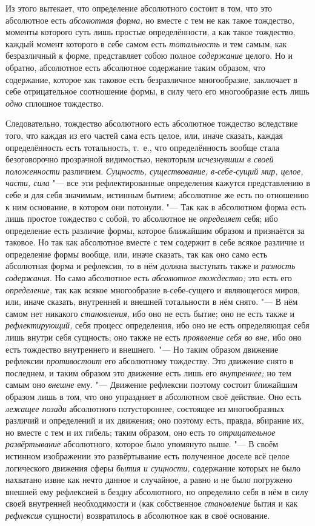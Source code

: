 Из этого вытекает, что определение абсолютного состоит в том, что это
абсолютное есть {\em абсолютная форма,} но вместе с тем
не как такое тождество, моменты которого суть лишь простые определённости,
а как такое тождество, каждый момент которого в себе самом есть
{\em тотальность} и тем самым, как безразличный к
форме, представляет собою полное {\em содержание}
целого. Но и обратно, абсолютное есть абсолютное содержание таким образом,
что содержание, которое как таковое есть безразличное многообразие,
заключает в себе отрицательное соотношение формы, в силу чего его
многообразие есть лишь {\em одно} сплошное тождество.

Следовательно, тождество абсолютного есть абсолютное тождество вследствие
того, что каждая из его частей сама есть целое, или, иначе сказать, каждая
определённость есть тотальность, т.~е., что определённость вообще стала
безоговорочно прозрачной видимостью, некоторым
{\em исчезнувшим в своей положенности} различием.
{\em Сущность, существование, в-себе-сущий мир, целое,
части, сила} "--- все эти рефлектированные определения кажутся представлению в
себе и для себя значимым, истинным бытием; абсолютное же есть по отношению
к ним основание, в котором они потонули. "--- Так как в абсолютном форма есть
лишь простое тождество с собой, то абсолютное не
{\em определяет} себя; ибо определение есть различие
формы, которое ближайшим образом и признаётся за таковое. Но так как
абсолютное вместе с тем содержит в себе всякое различие и определение формы
вообще, или, иначе сказать, так как оно само есть абсолютная форма и
рефлексия, то в нём должна выступать также и
{\em разность содержания}. Но само абсолютное есть
{\em абсолютное тождество;} это есть его
{\em определение,} так как всякое многообразие
в-себе-сущего и являющегося миров, или, иначе сказать, внутренней и внешней
тотальности в нём снято. "--- В нём самом нет никакого
{\em становления,} ибо оно не есть бытие; оно не есть
также и {\em рефлектирующий,} себя процесс определения,
ибо оно не есть определяющая себя лишь внутри себя сущность; оно также не
есть {\em проявление себя во вне,} ибо оно есть
тождество внутреннего и внешнего. "--- Но таким образом движение рефлексии
{\em противостоит} его абсолютному тождеству. Это
движение снято в последнем, и таким образом это движение есть лишь его
{\em внутреннее;} но тем самым оно
{\em внешне} ему. "--- Движение рефлексии поэтому состоит
ближайшим образом лишь в том, что оно упраздняет в абсолютном своё
действие. Оно есть {\em лежащее позади} абсолютного
потустороннее, состоящее из многообразных различий и определений и их
движения; оно поэтому есть, правда, вбирание их, но вместе с тем и их
гибель; таким образом, оно есть то {\em отрицательное
развёртывание} абсолютного, которое было упомянуто выше. "--- В своём истинном
изображении это развёртывание есть полученное доселе всё целое логического
движения сферы {\em бытия и сущности,} содержание
которых не было нахватано извне как нечто данное и случайное, а равно и не
было погружено внешней ему рефлексией в бездну абсолютного, но определило
себя в нём в силу своей внутренней необходимости и (как собственное
{\em становление} бытия и как
{\em рефлексия} сущности) возвратилось в абсолютное как
в своё основание.

